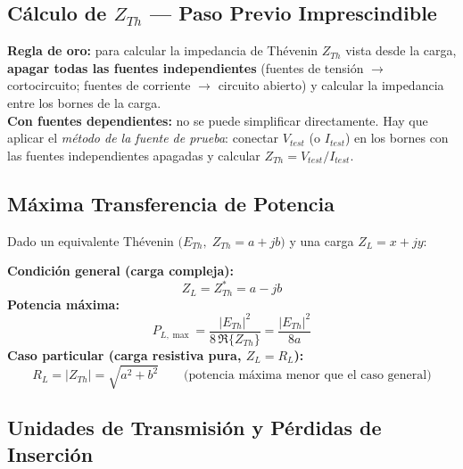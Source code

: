 \documentclass[12pt,a4paper]{article}
\begin{document}
\subsection{Cálculo de $Z_{Th}$ — Paso Previo Imprescindible}

\begin{warnbox}
\textbf{\color{warnorangeline}Regla de oro:} para calcular la impedancia de Thévenin
$Z_{Th}$ vista desde la carga, \textbf{apagar todas las fuentes independientes}
(fuentes de tensión $\to$ cortocircuito; fuentes de corriente $\to$ circuito abierto)
y calcular la impedancia entre los bornes de la carga.\\[4pt]
\textbf{Con fuentes dependientes:} no se puede simplificar directamente. Hay que aplicar
el \emph{método de la fuente de prueba}: conectar $V_{test}$ (o $I_{test}$) en los
bornes con las fuentes independientes apagadas y calcular
$Z_{Th} = V_{test}/I_{test}$.
\end{warnbox}

\subsection{Máxima Transferencia de Potencia}

Dado un equivalente Thévenin $\bigl(E_{Th},\;Z_{Th} = a + jb\bigr)$ y una carga
$Z_L = x + jy$:

\begin{formulabox}
\textbf{Condición general (carga compleja):}
\[
  Z_L = Z_{Th}^* = a - jb
\]
\textbf{Potencia máxima:}
\[
  P_{L,\max} = \frac{|E_{Th}|^2}{8\,\Re\{Z_{Th}\}} = \frac{|E_{Th}|^2}{8a}
\]
\textbf{Caso particular (carga resistiva pura, $Z_L = R_L$):}
\[
  R_L = |Z_{Th}| = \sqrt{a^2 + b^2}
  \qquad\text{(potencia máxima menor que el caso general)}
\]
\end{formulabox}

\subsection{Unidades de Transmisión y Pérdidas de Inserción}
\end{document}
